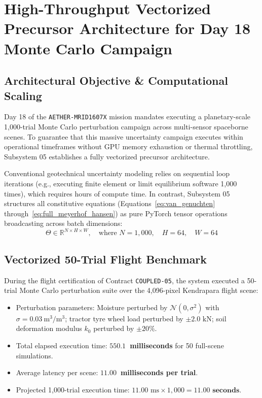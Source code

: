 \documentclass[11pt,a4paper]{article}
\theoremstyle{definition}
\theoremstyle{remark}
\begin{document}
\section{High-Throughput Vectorized Precursor Architecture for Day 18 Monte Carlo Campaign}

\subsection{Architectural Objective \& Computational Scaling}
Day 18 of the \texttt{AETHER-MRID1607X} mission mandates executing a planetary-scale 1,000-trial Monte Carlo perturbation campaign across multi-sensor spaceborne scenes. To guarantee that this massive uncertainty campaign executes within operational timeframes without GPU memory exhaustion or thermal throttling, Subsystem 05 establishes a fully vectorized precursor architecture.

Conventional geotechnical uncertainty modeling relies on sequential loop iterations (e.g., executing finite element or limit equilibrium software 1,000 times), which requires hours of compute time. In contrast, Subsystem 05 structures all constitutive equations (Equations~\eqref{eq:van_genuchten} through~\eqref{eq:full_meyerhof_hansen}) as pure PyTorch tensor operations broadcasting across batch dimensions:
\begin{equation}
    \Theta \in \mathbb{R}^{N \times H \times W}, \quad \text{where } N = 1,000, \quad H = 64, \quad W = 64
\end{equation}

\subsection{Vectorized 50-Trial Flight Benchmark}
During the flight certification of Contract \texttt{COUPLED-05}, the system executed a 50-trial Monte Carlo perturbation suite over the 4,096-pixel Kendrapara flight scene:
\begin{itemize}
    \item Perturbation parameters: Moisture perturbed by $\mathcal{N}(0, \sigma^2)$ with $\sigma = 0.03~\text{m}^3/\text{m}^3$; tractor tyre wheel load perturbed by $\pm 2.0\text{ kN}$; soil deformation modulus $k_0$ perturbed by $\pm 20\%$.
    \item Total elapsed execution time: \textbf{$550.1$~milliseconds} for 50 full-scene simulations.
    \item Average latency per scene: \textbf{$11.00$~milliseconds per trial}.
    \item Projected 1,000-trial execution time: $11.00\text{ ms} \times 1,000 = \mathbf{11.00\text{ seconds}}$.
\end{itemize}
\end{document}
